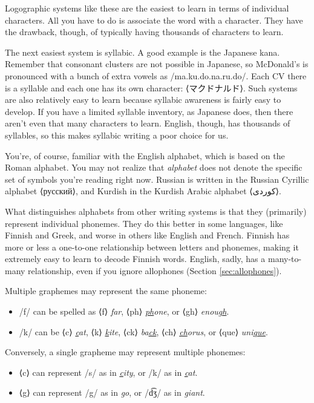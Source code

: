 Logographic systems like these are the easiest to learn in terms of individual characters. All you have to do is associate the word with a character. They have the drawback, though, of typically having thousands of characters to learn.

The next easiest system is syllabic. A good example is the Japanese kana. Remember that consonant clusters are not possible in Japanese, so McDonald's is pronounced with a bunch of extra vowels as /ma.ku.do.na.ru.do/. Each CV there is a syllable and each one has its own character: ⟨マクドナルド⟩. Such systems are also relatively easy to learn because syllabic awareness is fairly easy to develop. If you have a limited syllable inventory, as Japanese does, then there aren't even that many characters to learn. English, though, has thousands of syllables, so this makes syllabic writing a poor choice for us.

You're, of course, familiar with the English alphabet, which is based on the Roman alphabet. You may not realize that \textit{alphabet} does not denote the specific set of symbols you're reading right now. Russian is written in the Russian Cyrillic alphabet ⟨русский⟩, and Kurdish in the Kurdish Arabic alphabet ⟨کوردی⟩.

What distinguishes alphabets from other writing systems is that they (primarily) represent individual phonemes. They do this better in some languages, like Finnish and Greek, and worse in others like English and French. Finnish has more or less a one-to-one relationship between letters and phonemes, making it extremely easy to learn to decode Finnish words. English, sadly, has a many-to-many relationship, even if you ignore allophones (Section \ref{sec:allophones}). 

Multiple graphemes may represent the same phoneme:

\begin{itemize}[noitemsep]
    \item /f/ can be spelled as ⟨f⟩ \textit{\uline{f}ar}, ⟨ph⟩ \textit{\uline{ph}one}, or ⟨gh⟩ \textit{enou\uline{gh}}.
    \item /k/ can be ⟨c⟩ \textit{\uline{c}at}, ⟨k⟩ \textit{\uline{k}ite}, ⟨ck⟩ \textit{ba\uline{ck}}, ⟨ch⟩ \textit{\uline{ch}orus}, or ⟨que⟩ \textit{uni\uline{que}}.
\end{itemize}
        
Conversely, a single grapheme may represent multiple phonemes:
\begin{itemize}[noitemsep]
    \item ⟨c⟩ can represent /s/ as in \textit{\uline{c}ity}, or /k/ as in \textit{\uline{c}at}.
    \item ⟨g⟩ can represent /g/ as in \textit{\uline{g}o}, or /d͡ʒ/ as in \textit{\uline{g}iant}.
\end{itemize}
        
